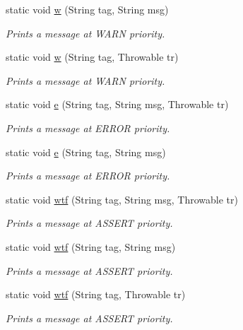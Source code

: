 \begin{DoxyCompactItemize}
static void \hyperlink{classcom_1_1toast_1_1android_1_1gamebase_1_1base_1_1log_1_1_logger_a514df8f7e3381ecc0c9dabf76723b688}{w} (String tag, String msg)
\begin{DoxyCompactList}\small\item\em Prints a message at W\+A\+RN priority. \end{DoxyCompactList}\item 
static void \hyperlink{classcom_1_1toast_1_1android_1_1gamebase_1_1base_1_1log_1_1_logger_aea8dff5a52edecf3597b8f086e941790}{w} (String tag, Throwable tr)
\begin{DoxyCompactList}\small\item\em Prints a message at W\+A\+RN priority. \end{DoxyCompactList}\item 
static void \hyperlink{classcom_1_1toast_1_1android_1_1gamebase_1_1base_1_1log_1_1_logger_a31c4de083ef2003f9fb433d639866537}{e} (String tag, String msg, Throwable tr)
\begin{DoxyCompactList}\small\item\em Prints a message at E\+R\+R\+OR priority. \end{DoxyCompactList}\item 
static void \hyperlink{classcom_1_1toast_1_1android_1_1gamebase_1_1base_1_1log_1_1_logger_a98ed530e788c0a6fef1e9b951d3693f9}{e} (String tag, String msg)
\begin{DoxyCompactList}\small\item\em Prints a message at E\+R\+R\+OR priority. \end{DoxyCompactList}\item 
static void \hyperlink{classcom_1_1toast_1_1android_1_1gamebase_1_1base_1_1log_1_1_logger_a5454c01be0df340788095415a591ef89}{wtf} (String tag, String msg, Throwable tr)
\begin{DoxyCompactList}\small\item\em Prints a message at A\+S\+S\+E\+RT priority. \end{DoxyCompactList}\item 
static void \hyperlink{classcom_1_1toast_1_1android_1_1gamebase_1_1base_1_1log_1_1_logger_a1242f028963a420d7e3ccb4f5694a65f}{wtf} (String tag, String msg)
\begin{DoxyCompactList}\small\item\em Prints a message at A\+S\+S\+E\+RT priority. \end{DoxyCompactList}\item 
static void \hyperlink{classcom_1_1toast_1_1android_1_1gamebase_1_1base_1_1log_1_1_logger_a3c834156048f909cd14a6244c0732fae}{wtf} (String tag, Throwable tr)
\begin{DoxyCompactList}\small\item\em Prints a message at A\+S\+S\+E\+RT priority. \end{DoxyCompactList}\end{DoxyCompactItemize}

